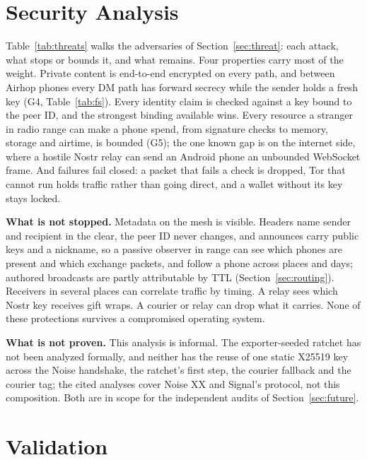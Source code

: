 \documentclass[conference]{IEEEtran}
\begin{document}
\section{Security Analysis}
\label{sec:security}

Table~\ref{tab:threats} walks the adversaries of Section~\ref{sec:threat}: each attack, what stops or bounds it, and what remains. Four properties carry most of the weight. Private content is end-to-end encrypted on every path, and between Airhop phones every DM path has forward secrecy while the sender holds a fresh key (G4, Table~\ref{tab:fs}). Every identity claim is checked against a key bound to the peer ID, and the strongest binding available wins. Every resource a stranger in radio range can make a phone spend, from signature checks to memory, storage and airtime, is bounded (G5); the one known gap is on the internet side, where a hostile Nostr relay can send an Android phone an unbounded WebSocket frame. And failures fail closed: a packet that fails a check is dropped, Tor that cannot run holds traffic rather than going direct, and a wallet without its key stays locked.

\textbf{What is not stopped.} Metadata on the mesh is visible. Headers name sender and recipient in the clear, the peer ID never changes, and announces carry public keys and a nickname, so a passive observer in range can see which phones are present and which exchange packets, and follow a phone across places and days; authored broadcasts are partly attributable by TTL (Section~\ref{sec:routing}). Receivers in several places can correlate traffic by timing. A relay sees which Nostr key receives gift wraps. A courier or relay can drop what it carries. None of these protections survives a compromised operating system.

\textbf{What is not proven.} This analysis is informal. The exporter-seeded ratchet has not been analyzed formally, and neither has the reuse of one static X25519 key across the Noise handshake, the ratchet's first step, the courier fallback and the courier tag; the cited analyses cover Noise XX and Signal's protocol, not this composition. Both are in scope for the independent audits of Section~\ref{sec:future}.

\section{Validation}
\label{sec:validation}
\end{document}
